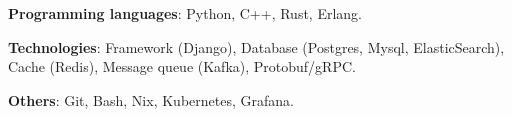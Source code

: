 \begin{cvempty} %
    \begin{cvitems} %
        \item{\textbf{Programming languages}: Python, C++, Rust, Erlang.}
        \item{\textbf{Technologies}: Framework (Django), Database (Postgres, Mysql, ElasticSearch), Cache (Redis), Message queue (Kafka), Protobuf/gRPC.}
        \item{\textbf{Others}: Git, Bash, Nix, Kubernetes, Grafana.}
    \end{cvitems}
\end{cvempty}
